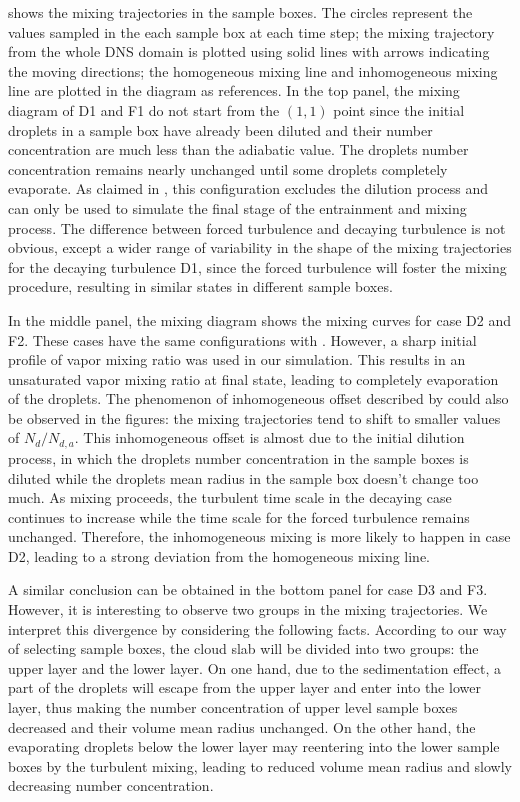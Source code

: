  
 shows the mixing trajectories in the sample boxes. The 
circles represent the values sampled in the each sample box at each time step; 
the mixing trajectory from the whole DNS domain is plotted using solid 
lines with arrows indicating the moving directions; the homogeneous mixing line and 
inhomogeneous mixing line are plotted in the diagram as references. 
In the top panel, the mixing diagram of D1 and F1 do not start from the $(1,1)$ 
point since the initial droplets in a sample box have already been diluted and 
their number concentration are much less than the adiabatic value. The droplets number concentration remains nearly unchanged until some droplets completely evaporate. 
As claimed in \cite{Andrejczuk2004}, this configuration excludes the dilution process and 
can only be used to simulate the final stage of the entrainment and mixing process. 
The difference between forced turbulence and decaying turbulence is not 
obvious, except a wider range of variability in the shape of the mixing 
trajectories for the decaying turbulence D1, since the forced turbulence 
will foster the mixing procedure, resulting in similar states in different 
sample boxes.

In the middle panel, the mixing diagram shows the mixing curves for case D2 and
F2. These cases have the same configurations with \cite{Kumar2014Lagrangian}. However, a
sharp initial profile of vapor mixing ratio was used in our simulation. This
results in an unsaturated vapor mixing ratio at final state, leading to
completely evaporation of the droplets. The phenomenon of inhomogeneous offset
described by \cite{Kumar2014Lagrangian} could also be observed in the figures: the mixing
trajectories tend to shift to smaller values of $N_d/N_{d,a}$. This
inhomogeneous offset is almost due to the initial dilution process, in which
the droplets number concentration in the sample boxes is diluted while the
droplets mean radius in the sample box doesn't change too much. As mixing
proceeds, the turbulent time scale in the decaying case continues to increase
while the time scale for the forced turbulence remains unchanged. Therefore,
the inhomogeneous mixing is more likely to happen in case D2, leading to a
strong deviation from the homogeneous mixing line.

A similar conclusion can be obtained in the bottom panel for case D3 and F3.
However, it is interesting to observe two groups in the mixing trajectories. We
interpret this divergence by considering the following facts. According to our
way of selecting sample boxes, the cloud slab will be divided into two groups:
the upper layer and the lower layer. On one hand, due to the
sedimentation effect, a part of the droplets will escape from the upper layer
and enter into the lower layer, thus making the number concentration of upper
level sample boxes decreased and their volume mean radius unchanged. On the
other hand, the evaporating droplets below the lower layer may reentering into
the lower sample boxes by the turbulent mixing, leading to reduced volume mean
radius and slowly decreasing number concentration.

